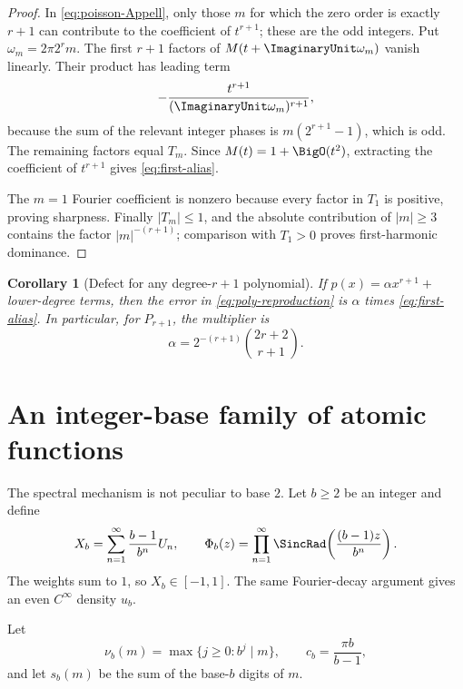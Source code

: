 \documentclass[11pt,oneside]{article}
\newtheorem{corollary}[theorem]{Corollary}
\theoremstyle{definition}
\theoremstyle{remark}
\begin{document}
\begin{proof}
In \eqref{eq:poisson-Appell}, only those \(m\) for which the zero order is
exactly \(r+1\) can contribute to the coefficient of \(t^{r+1}\); these are
the odd integers.  Put \(\omega_m=2\pi2^rm\).  The first \(r+1\) factors of
\(M(t+\ImaginaryUnit\omega_m)\) vanish linearly.  Their product has leading term
\[
 -\frac{t^{r+1}}{(\ImaginaryUnit\omega_m)^{r+1}},
\]
because the sum of the relevant integer phases is
\(m(2^{r+1}-1)\), which is odd.  The remaining factors equal \(T_m\).
Since \(M(t)=1+\BigO(t^2)\), extracting the coefficient of \(t^{r+1}\)
gives \eqref{eq:first-alias}.

The \(m=1\) Fourier coefficient is nonzero because every factor in \(T_1\)
is positive, proving sharpness.  Finally \(|T_m|\leq1\), and the absolute
contribution of \(|m|\geq3\) contains the factor
\(|m|^{-(r+1)}\); comparison with \(T_1>0\) proves first-harmonic dominance.
\end{proof}

\begin{corollary}[Defect for any degree-\(r+1\) polynomial]
If \(p(x)=\alpha x^{r+1}+\) lower-degree terms, then the error in
\eqref{eq:poly-reproduction} is \(\alpha\) times
\eqref{eq:first-alias}.  In particular, for \(P_{r+1}\), the multiplier is
\[
 \alpha=2^{-(r+1)}\binom{2r+2}{r+1}.
\]
\end{corollary}

\section{An integer-base family of atomic functions}

The spectral mechanism is not peculiar to base \(2\).  Let \(b\geq2\) be an
integer and define
\begin{equation}
 X_b=\sum_{n=1}^{\infty}\frac{b-1}{b^n}U_n,
 \qquad
 \Phi_b(z)=
 \prod_{n=1}^{\infty}
 \SincRad\!\left(\frac{(b-1)z}{b^n}\right).
 \label{eq:base-b}
\end{equation}
The weights sum to \(1\), so \(X_b\in[-1,1]\).  The same Fourier-decay
argument gives an even \(C^\infty\) density \(u_b\).

Let
\[
 \nu_b(m)=\max\{j\geq0:b^j\mid m\},\qquad
 c_b=\frac{\pi b}{b-1},
\]
and let \(s_b(m)\) be the sum of the base-\(b\) digits of \(m\).
\end{document}
